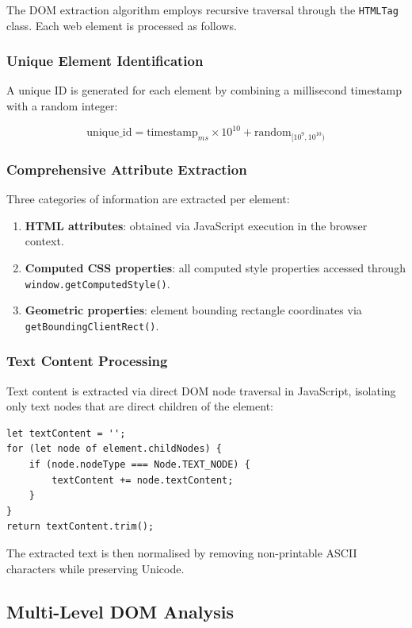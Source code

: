 The DOM extraction algorithm employs recursive traversal through the \texttt{HTMLTag} class. Each web element is processed as follows.

\subsubsection{Unique Element Identification}
A unique ID is generated for each element by combining a millisecond timestamp with a random integer:

\begin{equation}
\text{unique\_id} = \text{timestamp}_{ms} \times 10^{10} + \text{random}_{[10^9, 10^{10})}
\end{equation}

\subsubsection{Comprehensive Attribute Extraction}
Three categories of information are extracted per element:
\begin{enumerate}
    \item \textbf{HTML attributes}: obtained via JavaScript execution in the browser context.
    \item \textbf{Computed CSS properties}: all computed style properties accessed through \texttt{window.getComputedStyle()}.
    \item \textbf{Geometric properties}: element bounding rectangle coordinates via \texttt{getBoundingClientRect()}.
\end{enumerate}

\subsubsection{Text Content Processing}
Text content is extracted via direct DOM node traversal in JavaScript, isolating only text nodes that are direct children of the element:

\begin{lstlisting}[caption=Text Content Extraction]
let textContent = '';
for (let node of element.childNodes) {
    if (node.nodeType === Node.TEXT_NODE) {
        textContent += node.textContent;
    }
}
return textContent.trim();
\end{lstlisting}

The extracted text is then normalised by removing non-printable ASCII characters while preserving Unicode.

\subsection{Multi-Level DOM Analysis}
\label{subsec:multi-level-analysis}

